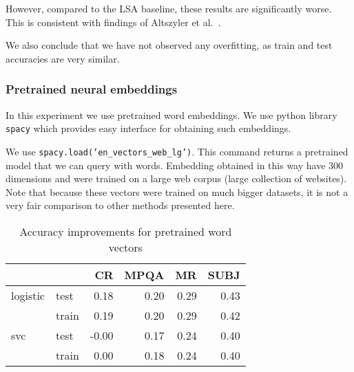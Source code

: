    However, compared to the LSA baseline, these results are significantly worse. 
    This is consistent with findings of Altszyler et al.~\cite{altszyler2016comparative}.
    
    We also conclude that we have not observed any overfitting, as train and test accuracies are very similar.
    

    \subsubsection{Pretrained neural embeddings}    
    
    In this experiment we use pretrained word embeddings. 
    We use python library \texttt{spacy} which provides easy interface for obtaining such embeddings.
    
    We use \texttt{spacy.load('en\_vectors\_web\_lg')}.
    This command returns a pretrained model that we can query with words. 
    Embedding obtained in this way have $300$ dimensions and were trained on a large web corpus (large collection of websites). 
    Note that because these vectors were trained on much bigger datasets, it is not a very fair comparison to other methods presented here.

    \begin{table}[h]
    \begin{center}
    
    \begin{tabular}{llrrrr}
    \toprule
     &&CR &MPQA &MR &SUBJ \\
    \midrule
    logistic & test & 0.18 & 0.20 & 0.29 & 0.43 \\
     & train & 0.19 & 0.20 & 0.29 & 0.42 \\
    svc & test &-0.00 & 0.17 & 0.24 & 0.40 \\
     & train & 0.00 & 0.18 & 0.24 & 0.40 \\
    \bottomrule
    \end{tabular}
    
    \caption[Accuracy improvements for pretrained word vectors]{Accuracy improvements for pretrained word vectors}
    \label{tab:res:pretrainedwordvec}
    \end{center}
    \end{table}
    

